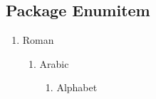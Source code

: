 \documentclass{article}
\begin{document}
\subsection{Package Enumitem}
\begin{enumerate}[label=(\roman*)]
  \item Roman
  \begin{enumerate}[label=\arabic*]
    \item Arabic
    \begin{enumerate}[label=\alph*]
      \item Alphabet
    \end{enumerate}
  \end{enumerate}
\end{enumerate}

\newpage
\begin{appendix}
 \listoffigures
 \listoftables
\end{appendix}
\end{document}
